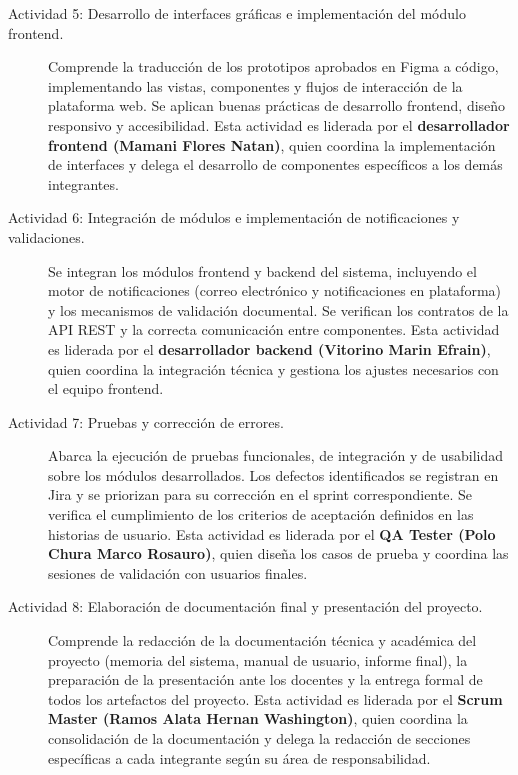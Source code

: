 \begin{description}
    \item[Actividad 5: Desarrollo de interfaces gráficas e implementación del módulo
    frontend.]
    Comprende la traducción de los prototipos aprobados en Figma a código, implementando
    las vistas, componentes y flujos de interacción de la plataforma web. Se aplican
    buenas prácticas de desarrollo frontend, diseño responsivo y accesibilidad. Esta
    actividad es liderada por el \textbf{desarrollador frontend (Mamani Flores Natan)},
    quien coordina la implementación de interfaces y delega el desarrollo de componentes
    específicos a los demás integrantes.

    \item[Actividad 6: Integración de módulos e implementación de notificaciones y
    validaciones.]
    Se integran los módulos frontend y backend del sistema, incluyendo el motor de
    notificaciones (correo electrónico y notificaciones en plataforma) y los mecanismos
    de validación documental. Se verifican los contratos de la API REST y la correcta
    comunicación entre componentes. Esta actividad es liderada por el \textbf{desarrollador
    backend (Vitorino Marin Efrain)}, quien coordina la integración técnica y gestiona los
    ajustes necesarios con el equipo frontend.

    \item[Actividad 7: Pruebas y corrección de errores.]
    Abarca la ejecución de pruebas funcionales, de integración y de usabilidad sobre los
    módulos desarrollados. Los defectos identificados se registran en Jira y se priorizan
    para su corrección en el sprint correspondiente. Se verifica el cumplimiento de los
    criterios de aceptación definidos en las historias de usuario. Esta actividad es
    liderada por el \textbf{QA Tester (Polo Chura Marco Rosauro)}, quien diseña los casos
    de prueba y coordina las sesiones de validación con usuarios finales.

    \item[Actividad 8: Elaboración de documentación final y presentación del proyecto.]
    Comprende la redacción de la documentación técnica y académica del proyecto (memoria
    del sistema, manual de usuario, informe final), la preparación de la presentación ante
    los docentes y la entrega formal de todos los artefactos del proyecto. Esta actividad
    es liderada por el \textbf{Scrum Master (Ramos Alata Hernan Washington)}, quien
    coordina la consolidación de la documentación y delega la redacción de secciones
    específicas a cada integrante según su área de responsabilidad.

\end{description}